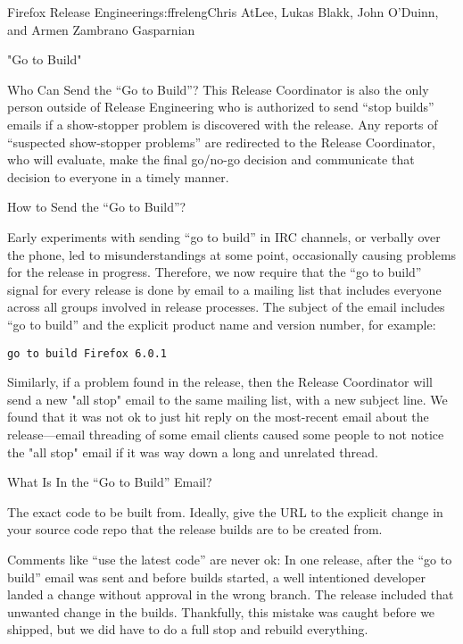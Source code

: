 \begin{aosachapter}{Firefox Release Engineering}{s:ffreleng}{Chris AtLee, Lukas Blakk, John O'Duinn, and Armen Zambrano Gasparnian}
\begin{aosasect1}{"Go to Build"}
\begin{aosasect2}{Who Can Send the ``Go to Build''?}
This Release Coordinator is also the only person outside of Release
Engineering who is authorized to send ``stop builds'' emails if a
show-stopper problem is discovered with the release. Any reports of
``suspected show-stopper problems'' are redirected to the Release
Coordinator, who will evaluate, make the final go/no-go decision and
communicate that decision to everyone in a timely manner.

\end{aosasect2}

\begin{aosasect2}{How to Send the ``Go to Build''?}

Early experiments with sending ``go to build'' in IRC channels, or
verbally over the phone, led to misunderstandings at some point,
occasionally causing problems for the release in progress. Therefore,
we now require that the ``go to build'' signal for every release is
done by email to a mailing list that includes everyone across all
groups involved in release processes. The subject of the email
includes ``go to build'' and the explicit product name and version
number, for example:

\begin{verbatim}
go to build Firefox 6.0.1
\end{verbatim}

Similarly, if a problem found in the release, then the Release
Coordinator will send a new "all stop" email to the same mailing list,
with a new subject line. We found that it was not ok to just hit reply
on the most-recent email about the release---email threading of some
email clients caused some people to not notice the "all stop" email if
it was way down a long and unrelated thread.

\end{aosasect2}

\begin{aosasect2}{What Is In the ``Go to Build'' Email?}

\begin{aosaenumerate}

\item The exact code to be built from. Ideally, give the URL to the
explicit change in your source code repo that the release builds are
to be created from.

  \begin{aosaenumerate2}

    \item Comments like ``use the latest code'' are never ok: In one
      release, after the ``go to build'' email was sent and before
      builds started, a well intentioned developer landed a change
      without approval in the wrong branch. The release included that
      unwanted change in the builds. Thankfully, this mistake was
      caught before we shipped, but we did have to do a full stop and
      rebuild everything.


\end{aosaenumerate2}
\end{aosaenumerate}
\end{aosasect2}
\end{aosasect1}
\end{aosachapter}
